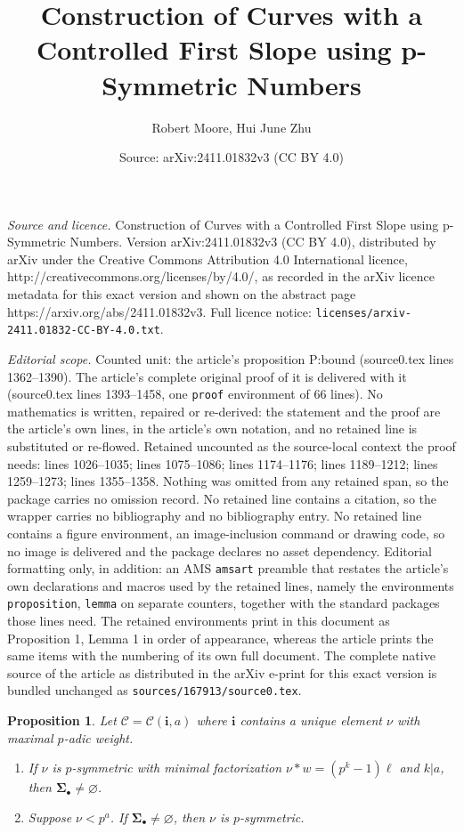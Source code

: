 \documentclass[10pt,a4paper]{amsart}
\title{Construction of Curves with a Controlled First Slope using p-Symmetric Numbers}
\author{Robert Moore, Hui June Zhu}
\date{Source: arXiv:2411.01832v3 (CC BY 4.0)}
\newtheorem{proposition}{Proposition}
\newcommand{\Sb}{\bSig_\bullet}
\newcommand{\bSig}{\mathbf\Sigma}
\newcommand{\bi}{\mathbf{i}}
\newcommand{\cC}{\mathcal{C}}
\begin{document}
\maketitle

\noindent\emph{Source and licence.} Construction of Curves with a Controlled First Slope using p-Symmetric Numbers. Version arXiv:2411.01832v3 (CC BY 4.0), distributed by arXiv under the Creative Commons Attribution 4.0 International licence, http://creativecommons.org/licenses/by/4.0/, as recorded in the arXiv licence metadata for this exact version and shown on the abstract page https://arxiv.org/abs/2411.01832v3. Full licence notice: \texttt{licenses/arxiv-2411.01832-CC-BY-4.0.txt}.\par\smallskip

\noindent\textit{Editorial scope.} Counted unit: the article's proposition P:bound (source0.tex lines 1362--1390). The article's complete original proof of it is delivered with it (source0.tex lines 1393--1458, one \texttt{proof} environment of 66 lines). No mathematics is written, repaired or re-derived: the statement and the proof are the article's own lines, in the article's own notation, and no retained line is substituted or re-flowed.  Retained uncounted as the source-local context the proof needs: lines 1026--1035; lines 1075--1086; lines 1174--1176; lines 1189--1212; lines 1259--1273; lines 1355--1358.  Nothing was omitted from any retained span, so the package carries no omission record.  No retained line contains a citation, so the wrapper carries no bibliography and no bibliography entry.  No retained line contains a figure environment, an image-inclusion command or drawing code, so no image is delivered and the package declares no asset dependency.  Editorial formatting only, in addition: an AMS \texttt{amsart} preamble that restates the article's own declarations and macros used by the retained lines, namely the environments \texttt{proposition}, \texttt{lemma} on separate counters, together with the standard packages those lines need.  The retained environments print in this document as Proposition 1, Lemma 1 in order of appearance, whereas the article prints the same items with the numbering of its own full document.  The complete native source of the article as distributed in the arXiv e-print for this exact version is bundled unchanged as \texttt{sources/167913/source0.tex}.
\begin{proposition}
\label{P:uniq-perm}
Let $\cC=\cC(\bi,a)$ where $\bi$ contains a unique element $\nu$ with maximal $p$-adic weight. 
\begin{enumerate}
\item If $\nu$ is $p$-symmetric with minimal factorization $\nu * w=(p^k-1)\ell$
and $k|a$, then $\Sb\neq \varnothing$. 
\item Suppose $\nu<p^a$. If $\Sb\neq \varnothing$, 
then $\nu$ is $p$-symmetric. 
\end{enumerate}
\end{proposition}
\end{document}

